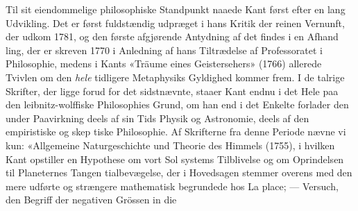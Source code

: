 \documentclass[12pt,a4paper]{book}
\begin{document}
Til sit eiendommelige philosophiske Standpunkt naaede
Kant først efter en lang Udvikling. Det er først fuldstændig
udpræget i hans Kritik der reinen Vernunft, der udkom 1781,
og den første afgjørende Antydning af det findes i en Afhand\-%
ling, der er skreven 1770 i Anledning af hans Tiltrædelse af
Professoratet i Philosophie, medens i Kants «Träume eines
Geistersehers» (1766) allerede Tvivlen om den \emph{hele} tidligere
Metaphysiks Gyldighed kommer frem. I de talrige Skrifter,
der ligge forud for det sidstnævnte, staaer Kant endnu i det
Hele paa den leibnitz-wolffiske Philosophies Grund, om han
end i det Enkelte forlader den under Paavirkning deels af sin
Tids Physik og Astronomie, deels af den empiristiske og skep\-%
tiske Philosophie. Af Skrifterne fra denne Periode nævne vi
kun: «Allgemeine Naturgeschichte und Theorie des Himmels
(1755), i hvilken Kant opstiller en Hypothese om vort Sol\-%
systems Tilblivelse og om Oprindelsen til Planeternes Tangen\-%
tialbevægelse, der i Hovedsagen stemmer overens med den
mere udførte og strængere mathematisk begrundede hos La\-%
place; --- Versuch, den Begriff der negativen Grössen in die
\end{document}
